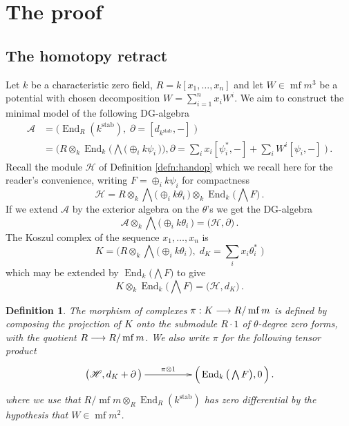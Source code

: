 \documentclass[english,letter paper,12pt,leqno]{article}
\theoremstyle{example}
\newtheorem{definition}[theorem]{Definition}
\numberwithin{equation}{section}
\def\stab{\operatorname{stab}}
\def\be{\begin{equation}}
\def\ee{\end{equation}}
\DeclareMathOperator{\End}{End}
\DeclareMathOperator{\mf}{mf}
\begin{document}
\section{The proof}

\subsection{The homotopy retract}

Let $k$ be a characteristic zero field, $R =  k[x_1,\ldots,x_n]$ and let $W \in \mf{m}^3$ be a potential with chosen decomposition $W = \sum_{i=1}^n x_i W^i$. We aim to construct the minimal model of the following DG-algebra
\begin{align*}
\mathscr{A} &= \Big( \End_{R}(k^{\operatorname{stab}}), \; \partial = [d_{k^{\stab}},-] \; \Big)\\
&= \Big( R \otimes_k \End_k\Big( \bigwedge\big( \oplus_i k\psi_i \,\big) \Big),  \partial = \sum_i x_i [\psi_i^*,-] + \sum_i W^i [\psi_i,-] \;\Big)\,.
\end{align*}
Recall the module $\mathscr{H}$ of Definition \ref{defn:handop} which we recall here for the reader's convenience, writing $F = \oplus_i k \psi_i$ for compactness
\[
\mathscr{H} = R \otimes_k \bigwedge\big( \oplus_i k \theta_i \,\big) \otimes_k \End_k\Big( \bigwedge F \Big)\,.
\]
If we extend $\mathscr{A}$ by the exterior algebra on the $\theta$'s we get the DG-algebra
\[
\mathscr{A} \otimes_k \bigwedge\big( \oplus_i k\theta_i \,\big) = \big( \mathscr{H}, \partial \big)\,.
\]
The Koszul complex of the sequence $x_1,\ldots,x_n$ is
\be\label{eq:defnkoszulK}
K = \Big( R \otimes_k \bigwedge\big( \oplus_i k \theta_i \,\big), \; d_K = \sum_i x_i \theta_i^*\; \Big)
\ee
which may be extended by $\End_k\big( \bigwedge F \big)$ to give
\[
K \otimes_k \End_k\big( \bigwedge F \big) = \big( \mathscr{H}, d_K \big)\,.
\]

\begin{definition} The morphism of complexes $\pi: K \lto R/\mf{m}$ is defined by composing the projection of $K$ onto the submodule $R \cdot 1$ of $\theta$-degree zero forms, with the quotient $R \lto R/\mf{m}$. We also write $\pi$ for the following tensor product
\[
\xymatrix@C+2pc{
\big( \mathscr{H}, d_K + \partial \,\big) \ar[r]^-{\pi \otimes 1} & \Big( \End_k\big( \bigwedge F \big), 0 \,\Big)\,.
}
\]
where we use that $R/\mf{m} \otimes_R \End_R(k^{\stab})$ has zero differential by the hypothesis that $W \in \mf{m}^2$. 
\end{definition}
\end{document}
